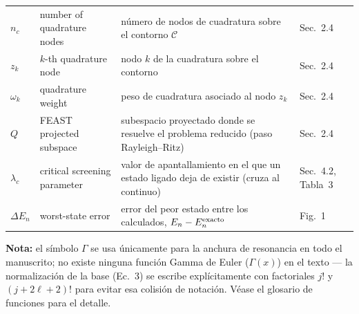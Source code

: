 \documentclass[11pt]{article}
\begin{document}
\begin{longtable}{@{}L{1.6cm}L{5.2cm}L{7.6cm}L{2.2cm}@{}}
$n_c$ & number of quadrature nodes & n\'umero de nodos de cuadratura sobre
  el contorno $\mathcal{C}$ & Sec.~2.4 \\
$z_k$ & $k$-th quadrature node & nodo $k$ de la cuadratura sobre el
  contorno & Sec.~2.4 \\
$\omega_k$ & quadrature weight & peso de cuadratura asociado al nodo $z_k$ &
  Sec.~2.4 \\
$Q$ & FEAST projected subspace & subespacio proyectado donde se resuelve el
  problema reducido (paso Rayleigh--Ritz) & Sec.~2.4 \\
$\lambda_c$ & critical screening parameter & valor de apantallamiento en el
  que un estado ligado deja de existir (cruza al continuo) & Sec.~4.2,
  Tabla~3 \\
$\Delta E_n$ & worst-state error & error del peor estado entre los
  calculados, $E_n-E_n^{\rm exacto}$ & Fig.~1 \\
\bottomrule
\end{longtable}
\endgroup

\vspace{1em}
\noindent\textbf{Nota:} el s\'imbolo $\Gamma$ se usa \'unicamente para la
anchura de resonancia en todo el manuscrito; no existe ninguna funci\'on
Gamma de Euler ($\Gamma(x)$) en el texto --- la normalizaci\'on de la base
(Ec.~3) se escribe expl\'icitamente con factoriales $j!$ y $(j+2\ell+2)!$
para evitar esa colisi\'on de notaci\'on. V\'ease el glosario de funciones
para el detalle.
\end{document}
